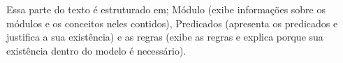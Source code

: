 Essa parte do texto é estruturado em; Módulo (exibe informações sobre os módulos e os conceitos neles contidos), Predicados (apresenta os predicados e justifica a sua existência) e as regras (exibe as regras e explica porque sua existência dentro do modelo é necessário). 